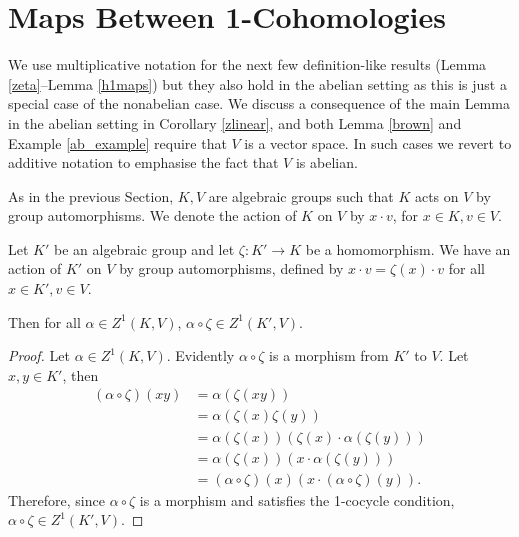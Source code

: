 \section{Maps Between 1-Cohomologies}

We use multiplicative notation for the next few definition-like results (Lemma \ref{zeta}--Lemma \ref{h1maps}) but they also hold in the abelian setting as this is just a special case of the nonabelian case. We discuss a consequence of the main Lemma in the abelian setting in Corollary \ref{zlinear}, and both Lemma \ref{brown} and Example \ref{ab_example} require that $V$ is a vector space. In such cases we revert to additive notation to emphasise the fact that $V$ is abelian.

As in the previous Section, $K, V$ are algebraic groups such that $K$ acts on $V$ by group automorphisms. We denote the action of $K$ on $V$ by $x \cdot v$, for $x \in K, v \in V$.

\begin{lemma} \label{zeta}
	Let $K'$ be an algebraic group and let $\zeta:K'\rightarrow K$ be a homomorphism. We have an action of $K'$ on $V$ by group automorphisms, defined by $x \cdot v = \zeta(x) \cdot v$ for all $x \in K', v \in V$.

	Then for all $\alpha \in Z^1(K, V)$, $\alpha \circ \zeta \in Z^1(K', V)$.
\end{lemma}
\begin{proof}
	Let $\alpha \in Z^1(K, V)$. Evidently $\alpha \circ \zeta$ is a morphism from $K'$ to $V$. Let $x, y \in K'$, then
	\begin{align*}
		(\alpha \circ \zeta)(xy) &= \alpha\left(\zeta(xy)\right) \\
			&= \alpha\left(\zeta(x)\zeta(y)\right) \\
			&= \alpha(\zeta(x))\left(\zeta(x) \cdot \alpha(\zeta(y))\right) \\
			&= \alpha(\zeta(x))\left(x \cdot \alpha(\zeta(y))\right) \\
			&= (\alpha\circ\zeta)(x)\left(x \cdot (\alpha\circ\zeta)(y)\right).
	\end{align*}
	Therefore, since $\alpha \circ \zeta$ is a morphism and satisfies the 1-cocycle condition, $\alpha \circ \zeta \in Z^1(K', V)$.
\end{proof}

